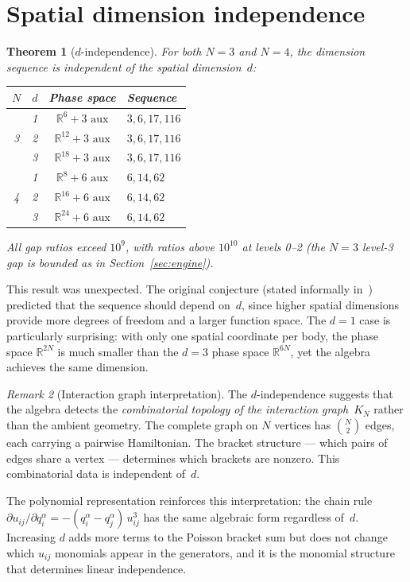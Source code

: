 \documentclass[11pt,a4paper]{article}
\newtheorem{theorem}{Theorem}
\theoremstyle{remark}
\newtheorem{remark}[theorem]{Remark}
\newcommand{\R}{\mathbb{R}}
\begin{document}
\section{Spatial dimension independence}
\label{sec:dim}

\begin{theorem}[$d$-independence]
\label{thm:d-indep}
For both $N{=}3$ and $N{=}4$, the dimension sequence is
independent of the spatial dimension~$d$:
\begin{center}
\begin{tabular}{@{}cccl@{}}
\toprule
$N$ & $d$ & Phase space & Sequence \\
\midrule
\multirow{3}{*}{3}
  & 1 & $\R^{6} + 3\text{ aux}$ & $3, 6, 17, 116$ \\
  & 2 & $\R^{12} + 3\text{ aux}$ & $3, 6, 17, 116$ \\
  & 3 & $\R^{18} + 3\text{ aux}$ & $3, 6, 17, 116$ \\
\midrule
\multirow{3}{*}{4}
  & 1 & $\R^{8} + 6\text{ aux}$ & $6, 14, 62$ \\
  & 2 & $\R^{16} + 6\text{ aux}$ & $6, 14, 62$ \\
  & 3 & $\R^{24} + 6\text{ aux}$ & $6, 14, 62$ \\
\bottomrule
\end{tabular}
\end{center}
All gap ratios exceed $10^{9}$, with ratios above $10^{10}$
at levels 0--2 (the $N{=}3$ level-3 gap is bounded as in
Section~\ref{sec:engine}).
\end{theorem}

This result was unexpected.  The original conjecture
(stated informally in~\cite{paper1}) predicted that the
sequence should depend on~$d$, since higher spatial
dimensions provide more degrees of freedom and a larger
function space.  The $d{=}1$ case is particularly
surprising: with only one spatial coordinate per body,
the phase space $\R^{2N}$ is much smaller than the
$d{=}3$ phase space $\R^{6N}$, yet the algebra achieves
the same dimension.

\begin{remark}[Interaction graph interpretation]
The $d$-independence suggests that the algebra detects
the \emph{combinatorial topology of the interaction
graph}~$K_N$ rather than the ambient geometry.  The
complete graph on $N$ vertices has $\binom{N}{2}$ edges,
each carrying a pairwise Hamiltonian.  The bracket
structure --- which pairs of edges share a vertex ---
determines which brackets are nonzero.  This
combinatorial data is independent of~$d$.

The polynomial representation reinforces this
interpretation: the chain rule
$\partial u_{ij} / \partial q_i^\alpha =
-(q_i^\alpha - q_j^\alpha)\, u_{ij}^3$
has the same algebraic form regardless of~$d$.
Increasing $d$ adds more terms to the Poisson bracket
sum but does not change which $u_{ij}$ monomials appear
in the generators, and it is the monomial structure that
determines linear independence.
\end{remark}
\end{document}
